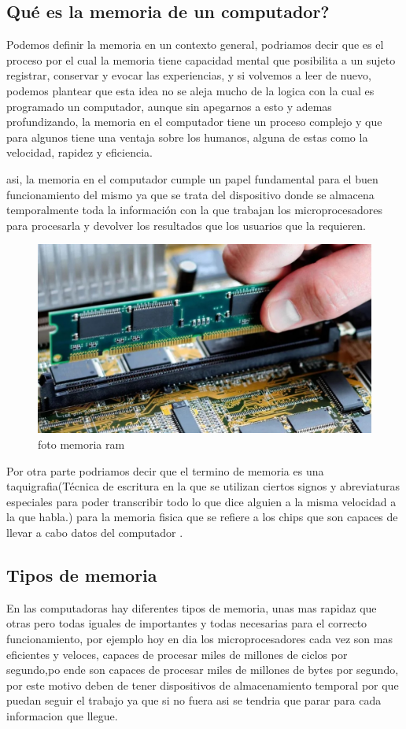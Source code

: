 \documentclass{article}
\begin{document}
    \subsection{Qué es la memoria de un computador?}
    Podemos definir la memoria en un contexto general, podriamos decir que es el proceso por el cual la memoria tiene capacidad mental que posibilita a un sujeto registrar, conservar y evocar las experiencias\cite{hipocampo}, y si volvemos a leer de nuevo, podemos plantear que esta idea no se aleja mucho de la logica con la cual es programado un computador, aunque sin apegarnos a esto y ademas profundizando, la memoria en el computador tiene un proceso complejo y que para algunos tiene una ventaja sobre los humanos, alguna de estas como la velocidad, rapidez y eficiencia.
    
    asi, la memoria en el computador cumple un papel fundamental para el buen funcionamiento del mismo  ya que se trata del dispositivo donde se almacena temporalmente toda la información con la que trabajan los microprocesadores para procesarla y devolver los resultados que los usuarios que la requieren.

    \begin{figure}[h]
    \includegraphics[width=6 cm]{imagenes/tipo_memoria.jpg}
    \centering
    \caption{foto memoria ram}
    \label{fig:tipo_memoria}
    \end{figure}

    Por otra parte podriamos decir que el termino de memoria es una taquigrafia(Técnica de escritura en la que se utilizan ciertos signos y abreviaturas especiales para poder transcribir todo lo que dice alguien a la misma velocidad a la que habla.) para la memoria fisica que se refiere a los chips que son capaces de llevar a cabo datos del computador \cite{monografias}.
    
    \subsection{Tipos de memoria}
    En las computadoras hay diferentes tipos de memoria, unas mas rapidaz que otras pero todas iguales de importantes y todas necesarias para el correcto funcionamiento, por ejemplo hoy en dia los microprocesadores cada vez son mas eficientes y veloces, capaces de procesar miles de millones de ciclos por segundo,po ende son capaces de procesar 
    miles de millones de bytes por segundo, por este motivo deben de tener dispositivos de almacenamiento temporal por que puedan seguir el trabajo ya que si no fuera asi se tendria que parar para cada informacion que llegue.
    
\end{document}
